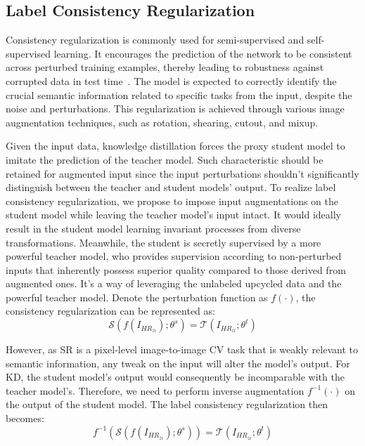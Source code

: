 \documentclass[10pt,twocolumn,letterpaper]{article}
\newcommand{\red}[1]{{\color{black}#1}}
\begin{document}
\red{
\subsection{Label Consistency Regularization}

Consistency regularization is commonly used for semi-supervised and self-supervised learning. It encourages the prediction of the network to be consistent across perturbed training examples, thereby leading to robustness against corrupted data in test time~\cite{oliver2018realistic, englesson2021consistency,jeong2019consistency}. The model is expected to correctly identify the crucial semantic information related to specific tasks from the input, despite the noise and perturbations. This regularization is achieved through various image augmentation techniques, such as rotation, shearing, cutout, and mixup.

Given the input data, knowledge distillation forces the proxy student model to imitate the prediction of the teacher model. Such characteristic should be retained for augmented input since the input perturbations shouldn't significantly distinguish between the teacher and student models' output. To realize label consistency regularization, we propose to impose input augmentations on the student model while leaving the teacher model's input intact. It would ideally result in the student model learning invariant processes from diverse transformations. Meanwhile, the student is secretly supervised by a more powerful teacher model, who provides supervision according to non-perturbed inputs that inherently possess superior quality compared to those derived from augmented ones. It's a way of leveraging the unlabeled upcycled data and the powerful teacher model. Denote the perturbation function as $f(\cdot)$, the consistency regularization can be represented as:
\vspace{-0.25em}\begin{equation*}
    \mathcal{S}(f(I_{HR_{zi}}); \theta^s) = \mathcal{T}(I_{HR_{zi}}; \theta^t)
\end{equation*}

However, as SR is a pixel-level image-to-image CV task that is weakly relevant to semantic information, any tweak on the input will alter the model's output. For KD, the student model's output would consequently be incomparable with the teacher model's. Therefore, we need to perform inverse augmentation $f^{-1}(\cdot)$ on the output of the student model. The label consistency regularization then becomes:
\vspace{-0.25em}\begin{equation*}
    f^{-1}(\mathcal{S}(f(I_{HR_{zi}}); \theta^s)) = \mathcal{T}(I_{HR_{zi}}; \theta^t)
\end{equation*}
}
\end{document}

